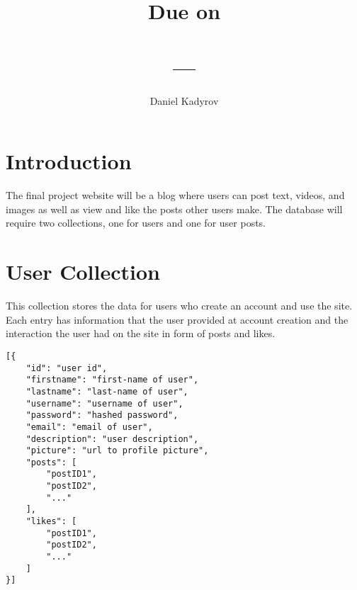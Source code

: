 \documentclass{homework}
\title{
    \Title\\
    \vspace{2mm}
    \large
    Due on \DueDate\\
    \ClassName\\ 
    \ClassNumber---\ClassSection\\
    \Instructor
}
\author{Daniel Kadyrov}
\date{}
\begin{document}
\maketitle
\thispagestyle{empty}

\newpage
\section{Introduction}

The final project website will be a blog where users can post text, videos, and images as well as view and like the posts other users make. The database will require two collections, one for users and one for user posts.

\section{User Collection}

This collection stores the data for users who create an account and use the site. Each entry has information that the user provided at account creation and the interaction the user had on the site in form of posts and likes. \\

\begin{lstlisting}[caption={JSON for User Collection}, captionpos=b]
[{
    "id": "user id",
    "firstname": "first-name of user",
    "lastname": "last-name of user",
    "username": "username of user",
    "password": "hashed password",
    "email": "email of user",
    "description": "user description",
    "picture": "url to profile picture",
    "posts": [
        "postID1",
        "postID2",
        "..."
    ],
    "likes": [
        "postID1",
        "postID2",
        "..."
    ]
}]
\end{lstlisting}
\end{document}
